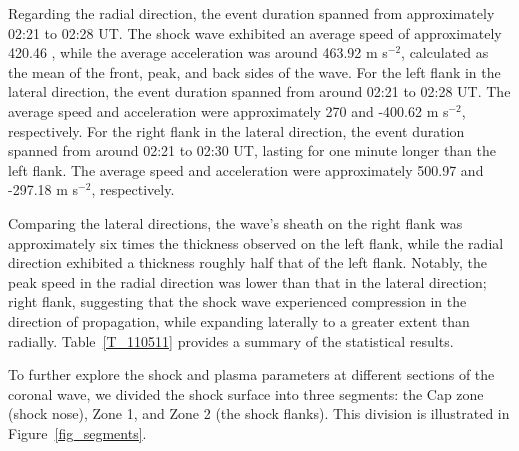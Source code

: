 Regarding the radial direction, the event duration spanned from approximately 02:21 to 02:28 UT. The shock wave exhibited an average speed of approximately 420.46 \kms, while the average acceleration was around 463.92 m s$^{-2}$, calculated as the mean of the front, peak, and back sides of the wave. For the left flank in the lateral direction, the event duration spanned from around 02:21 to 02:28 UT. The average speed and acceleration were approximately 270 \kms and -400.62 m s$^{-2}$, respectively. For the right flank in the lateral direction, the event duration spanned from around 02:21 to 02:30 UT, lasting for one minute longer than the left flank. The average speed and acceleration were approximately 500.97 \kms and -297.18 m s$^{-2}$, respectively.

Comparing the lateral directions, the wave's sheath on the right flank was approximately six times the thickness observed on the left flank, while the radial direction exhibited a thickness roughly half that of the left flank. Notably, the peak speed in the radial direction was lower than that in the lateral direction; right flank, suggesting that the shock wave experienced compression in the direction of propagation, while expanding laterally to a greater extent than radially. Table~\ref{T_110511} provides a summary of the statistical results.

To further explore the shock and plasma parameters at different sections of the coronal wave, we divided the shock surface into three segments: the Cap zone (shock nose), Zone 1, and Zone 2 (the shock flanks). This division is illustrated in Figure~\ref{fig_segments}.

